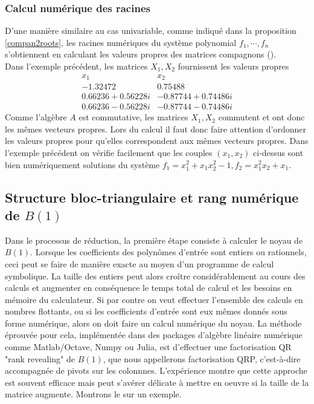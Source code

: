 \documentclass{article}
\theoremstyle{plain}%
\theoremstyle{definition}
\theoremstyle{remark}
\begin{document}
\subsubsection{Calcul numérique des racines}
D'une manière similaire au cas univariable, comme indiqué dans la proposition \ref{compan2roots}, les racines numériques du système polynomial $f_1, \cdots, f_n$ s'obtiennent en calculant les valeurs propres des matrices compagnons (\cite{AS}).\\
Dans l'exemple précédent, les matrices $X_1, X_2$ fournissent les valeurs propres 
$$
\begin{array}{c|c}
	x_1 & x_2 \\
	\hline
	-1.32472  & 0.75488 \\
	0.66236 + 0.56228i & -0.87744 + 0.74486i \\
	0.66236 - 0.56228i & -0.87744 - 0.74486i
\end{array} 
$$
Comme l'algèbre $A$ est commutative, les matrices $X_1, X_2$ commutent et ont donc les mêmes vecteurs propres. Lors du calcul il faut donc faire attention d'ordonner les valeurs propres pour qu'elles correspondent aux mêmes vecteurs propres.
Dans l'exemple précédent on vérifie facilement que les couples $(x_1, x_2)$ ci-dessus sont bien numériquement solutions du système $f_1 = x_1^2 + x_1x_2^2 - 1, f_2 = x_1^2x_2 + x_1$.

\subsection{Structure bloc-triangulaire et rang numérique de $B(1)$}
Dans le processus de réduction, la première étape consiste à calculer le noyau de $B(1)$. Lorsque les coefficients des polynômes d'entrée sont entiers ou rationnels, ceci peut se faire de manière exacte au moyen d'un programme de calcul symbolique. La taille des entiers peut alors croître considérablement au cours des calculs et augmenter en conséquence le temps total de calcul et les besoins en mémoire du calculateur. Si par contre on veut effectuer l'ensemble des calculs en nombres flottants, ou si les coefficients d'entrée sont eux mêmes donnés sous forme numérique, alors on doit faire un calcul numérique du noyau.
La méthode éprouvée pour cela, implémentée dans des packages d'algèbre linéaire numérique comme Matlab/Octave, Numpy ou Julia, est d'effectuer une factorisation QR "rank revealing" de $B(1)$, que nous appellerons factorisation QRP, c'est-à-dire accompagnée de pivots sur les colonnnes. L'expérience montre que cette approche est souvent efficace mais peut s'avérer délicate à mettre en oeuvre si la taille de la matrice augmente. Montrons le sur un exemple.
\end{document}
